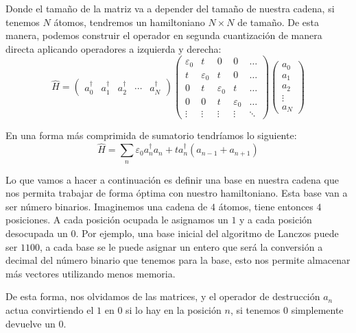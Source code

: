 \documentclass{article} %
\begin{document}
Donde el tamaño de la matriz va a depender del tamaño de nuestra cadena, si tenemos $N$ átomos, tendremos un hamiltoniano $N \times N$ de tamaño. De esta manera, podemos construir el operador en segunda cuantización de manera directa aplicando operadores a izquierda y derecha:
\begin{equation}
    \hat{H} = \left(\begin{array}{ccccc}
        a_0^{\dagger} & a_1^{\dagger} & a_2^{\dagger} & \cdots & a_N^{\dagger}
    \end{array}\right)\left(\begin{array}{ccccc}
        \varepsilon_0 & t & 0 & 0 & \ldots \\
        t & \varepsilon_0 & t & 0 & \ldots \\
        0 & t & \varepsilon_0 & t & \ldots \\
        0 & 0 & t & \varepsilon_0 & \ldots \\
        \vdots & \vdots & \vdots & \vdots & \ddots
    \end{array}\right)\left(\begin{array}{c}
        a_0 \\
        a_1 \\
        a_2 \\
        \vdots \\
        a_N
    \end{array}\right)
\end{equation}

En una forma más comprimida de sumatorio tendríamos lo siguiente:
\begin{equation}
    \hat{H} = \sum_n \varepsilon_0 a_n^{\dagger} a_n + t a_n^{\dagger}\left(a_{n-1} + a_{n+1}\right)
\end{equation}

Lo que vamos a hacer a continuación es definir una base en nuestra cadena que nos permita trabajar de forma óptima con nuestro hamiltoniano. Esta base van a ser número binarios. Imaginemos una cadena de $4$ átomos, tiene entonces $4$ posiciones. A cada posición ocupada le asignamos un $1$ y a cada posición desocupada un $0$. Por ejemplo, una base inicial del algoritmo de Lanczos puede ser $1100$, a cada base se le puede asignar un entero que será la conversión a decimal del número binario que tenemos para la base, esto nos permite almacenar más vectores utilizando menos memoria.

De esta forma, nos olvidamos de las matrices, y el operador de destrucción $a_n$ actua convirtiendo el $1$ en $0$ si lo hay en la posición $n$, si tenemos $0$ simplemente devuelve un $0$.
\end{document}
